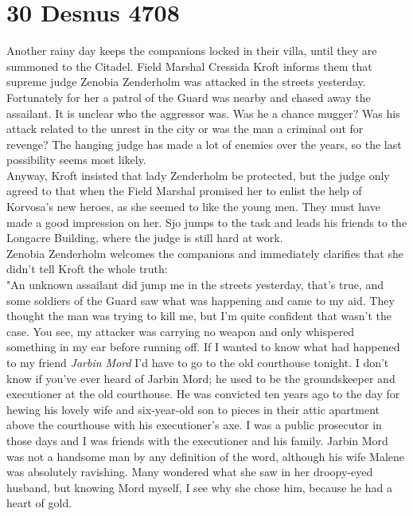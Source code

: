 \section{30 Desnus 4708}

Another rainy day keeps the companions locked in their villa, until they are summoned to the Citadel. Field Marshal Cressida Kroft informs them that supreme judge Zenobia Zenderholm was attacked in the streets yesterday. Fortunately for her a patrol of the Guard was nearby and chased away the assailant. It is unclear who the aggressor was. Was he a chance mugger? Was his attack related to the unrest in the city or was the man a criminal out for revenge? The hanging judge has made a lot of enemies over the years, so the last possibility seems most likely.\\

Anyway, Kroft insisted that lady Zenderholm be protected, but the judge only agreed to that when the Field Marshal promised her to enlist the help of Korvosa's new heroes, as she seemed to like the young men. They must have made a good impression on her. Sjo jumps to the task and leads his friends to the Longacre Building, where the judge is still hard at work.\\

Zenobia Zenderholm welcomes the companions and immediately clarifies that she didn't tell Kroft the whole truth:\\

"An unknown assailant did jump me in the streets yesterday, that's true, and some soldiers of the Guard saw what was happening and came to my aid. They thought the man was trying to kill me, but I'm quite confident that wasn't the case. You see, my attacker was carrying no weapon and only whispered something in my ear before running off. If I wanted to know what had happened to my friend {\itshape Jarbin Mord} I'd have to go to the old courthouse tonight. I don't know if you've ever heard of Jarbin Mord; he used to be the groundskeeper and executioner at the old courthouse. He was convicted ten years ago to the day for hewing his lovely wife and six-year-old son to pieces in their attic apartment above the courthouse with his executioner's axe. I was a public prosecutor in those days and I was friends with the executioner and his family. Jarbin Mord was not a handsome man by any definition of the word, although his wife Malene was absolutely ravishing. Many wondered what she saw in her droopy-eyed husband, but knowing Mord myself, I see why she chose him, because he had a heart of gold.\\

